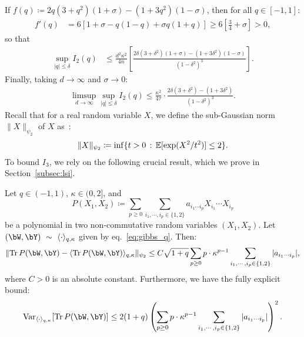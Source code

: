 If $f(q) \coloneqq 2q(3+q^2) (1+\sigma) - (1+3q^2) (1-\sigma)$, then for all $q \in [-1,1]$:
\begin{align}\label{eq:fprime_q}
    f'(q) &= 6 [1+\sigma - q (1-q) + \sigma q (1+q)] \geq 6 \left[\frac{3}{4}+\sigma\right] > 0,
\end{align}
so that 
\begin{align*}
    \sup_{|q| \leq \delta} I_2(q) &\leq \frac{d^2 \kappa^2}{4n} \left[\frac{2\delta(3+\delta^2) (1+\sigma) - (1+3\delta^2) (1-\sigma)}{(1-\delta^2)^3}\right].
\end{align*}
Finally, taking $d \to \infty$ and $\sigma \to 0$:
\begin{align}\label{eq:ub_I2}
    \limsup_{d \to \infty} \sup_{|q| \leq \delta} I_2(q) \leq \frac{\kappa^2}{4\tau} \cdot \frac{2 \delta(3+\delta^2) - (1+3\delta^2)}{(1-\delta^2)^3}.
\end{align}
Recall that for a real random variable $X$, we define the sub-Gaussian norm $\|X\|_{\psi_2}$ of $X$ as~\citep{vershynin2018high}:
\begin{align*}
    \|X\|_{\psi_2} \coloneqq \inf \{t > 0 \, : \, \mathbb{E}[\exp(X^2/t^2)] \leq 2\}. 
\end{align*}
To bound $I_3$, we rely on the following crucial result, which we prove in Section~\ref{subsec:lsi}.
\begin{lemma}
    \label{lemma:conc_moments_Pqkappa}
    Let $q \in (-1,1)$, $\kappa \in (0,2]$, and 
    \begin{equation*}
    P(X_1, X_2) \coloneqq \sum_{p\geq 0}\sum_{i_1, \cdots, i_p \in \{1,2\}} a_{i_1 \cdots i_p} X_{i_1} \cdots X_{i_p}
    \end{equation*}
    be a polynomial 
    in two non-commutative random variables $(X_1, X_2)$.
    Let $(\bW, \bY)~\sim~\langle \cdot \rangle_{q,\kappa}$ given by eq.~\eqref{eq:gibbs_q}.
    Then: 
    \begin{equation*}
    \|\Tr \, P(\bW, \bY) - \langle \Tr \, P(\bW, \bY) \rangle_{q,\kappa} \|_{\psi_2} \leq C \sqrt{1+q} 
    \sum_{p\geq 0} p \cdot \kappa^{p-1}\sum_{i_1, \cdots, i_p \in \{1,2\}} |a_{i_1 \cdots i_p}|,
    \end{equation*}
    where $C > 0$ is an absolute constant. Furthermore, we have the fully explicit bound:
    \begin{equation}\label{eq:var_PWY}
        \Var_{\langle \cdot \rangle_{q,\kappa}} [\Tr \, P(\bW, \bY)] \leq 
         2(1+q)
        \left(\sum_{p\geq 0} p \cdot \kappa^{p-1}\sum_{i_1, \cdots, i_p \in \{1,2\}} |a_{i_1 \cdots i_p}|\right)^2.
    \end{equation}
\end{lemma}

